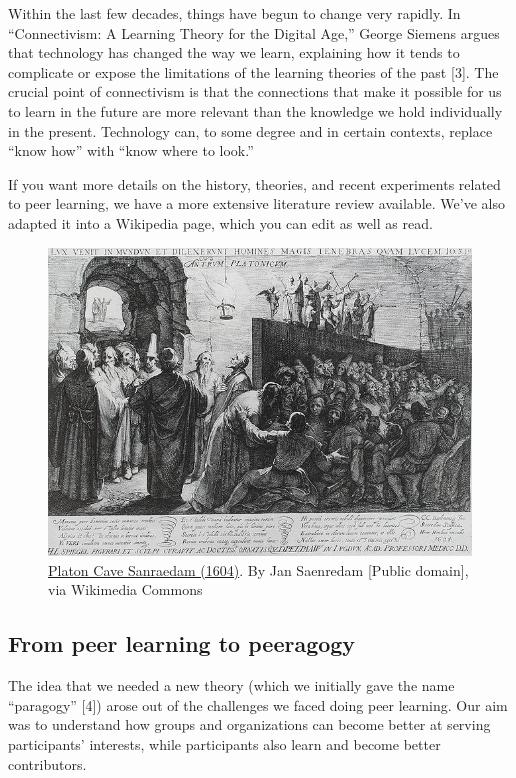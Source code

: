 Within the last few decades, things have begun to change very rapidly.
In ``Connectivism: A Learning Theory for the Digital Age,'' George
Siemens argues that technology has changed the way we learn, explaining
how it tends to complicate or expose the limitations of the learning
theories of the past {[}3{]}. The crucial point of connectivism is that
the connections that make it possible for us to learn in the future are
more relevant than the knowledge we hold individually in the present.
Technology can, to some degree and in certain contexts, replace ``know
how'' with ``know where to look.''

If you want more details on the history, theories, and recent
experiments related to peer learning, we have a more extensive
literature review available. We've also adapted it into a Wikipedia
page, which you can edit as well as read.

\begin{figure}
\begin{center}
\includegraphics[width=.8\textwidth]{../pictures/plato_cave.jpg}
\end{center}
\caption*{\href{http://commons.wikimedia.org/w/index.php?title=File:Platon\_Cave\_Sanraedam\_1604.jpg\&oldid=68567627}{Platon Cave Sanraedam (1604)}. By Jan Saenredam {[}Public domain{]}, via
Wikimedia Commons}
\end{figure}

\subsection{From peer learning to peeragogy}

The idea that we needed a new theory (which we initially gave the name
``paragogy'' {[}4{]}) arose out of the challenges we faced doing peer
learning. Our aim was to understand how groups and organizations can
become better at serving participants' interests, while participants
also learn and become better contributors.

